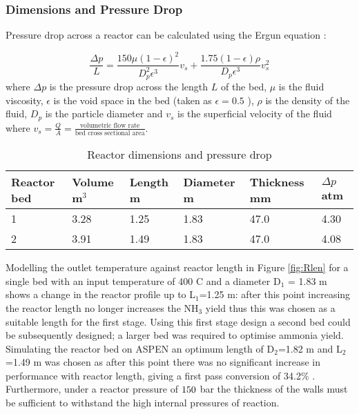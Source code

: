 \subsubsection{Dimensions and Pressure Drop}

Pressure drop across a reactor can be calculated using the Ergun equation \cite{Ergun1949}:

\begin{equation}
\frac{\Delta p}{L}= \frac{150\mu(1-\epsilon)^2}{D_p^2\epsilon ^3}v_s+\frac{1.75(1-\epsilon)\rho}{D_p\epsilon ^3}v_s^2
\end{equation}
where $\Delta p$ is the pressure drop across the length $L$ of the bed, $\mu$ is the fluid viscosity, $\epsilon$ is the void space in the bed (taken as $\epsilon = 0.5$ \cite{Ergun1949}), $\rho$ is the density of the fluid, $D_p$ is the particle diameter and $v_s$ is the superficial velocity of the fluid where $v_s = \frac{Q}{A} = \frac{\text{volumetric flow rate}}{\text{bed cross sectional area}}$.
\begin{table}[!htbp]
	\begin{center}
		\caption{Reactor dimensions and pressure drop}
		\begin{tabular}{ |p{2.3cm}|p{2.3cm}|p{2.3cm}|p{2.3cm}|p{2.7cm}|p{2.3cm}| }
			\hline
			
			Reactor bed & Volume m$^3$& Length m&Diameter m&Thickness mm&$\Delta p$ atm\\
			\hline
			1&3.28 & 1.25 &1.83 &47.0& 4.30\\
			\hline
			2&3.91 & 1.49 &1.83 &47.0&4.08\\
			
			\hline
		\end{tabular}
	\end{center}
\end{table}


Modelling the outlet temperature against reactor length in Figure \ref{fig:Rlen} for a single bed with an input temperature of 400 \textdegree C and a diameter D$_1$ = 1.83 m shows a change in the reactor profile up to L$_1$=1.25 m: after this point increasing the reactor length no longer increases the NH$_3$ yield thus this was chosen as a suitable length for the first stage. Using this first stage design a second bed could be subsequently designed; a larger bed was required to optimise ammonia yield. Simulating the reactor bed on ASPEN an optimum length of D$_2$=1.82 m and L$_2$=1.49 m was chosen as after this point there was no significant increase in performance with reactor length, giving a first pass conversion of 34.2\% \cite{Elnashaie1989}. Furthermore, under a reactor pressure of $150$  bar the thickness of the walls must be sufficient to withstand the high internal pressures of reaction.

